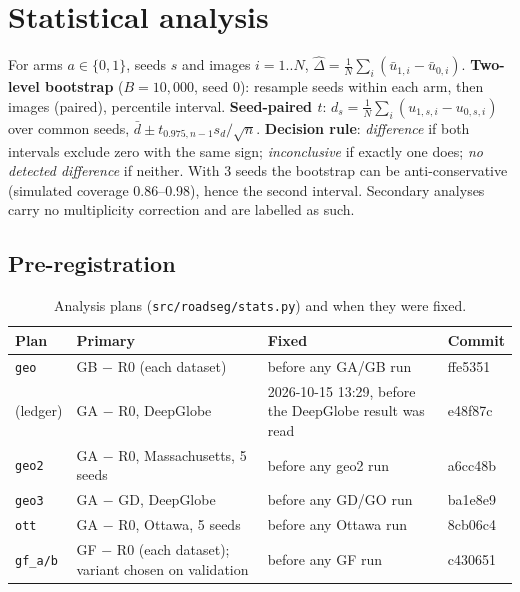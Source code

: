 \documentclass[11pt]{article}
\begin{document}
\section{Statistical analysis}
\label{sec:stats}

For arms $a\in\{0,1\}$, seeds $s$ and images $i=1..N$, $\hat\Delta = \frac1N\sum_i(\bar u_{1,i}-\bar u_{0,i})$.
\textbf{Two-level bootstrap} ($B=10{,}000$, seed 0): resample seeds within each arm, then images
(paired), percentile interval. \textbf{Seed-paired $t$}: $d_s=\frac1N\sum_i(u_{1,s,i}-u_{0,s,i})$ over
common seeds, $\bar d\pm t_{0.975,n-1}s_d/\sqrt n$. \textbf{Decision rule}: \emph{difference} if both
intervals exclude zero with the same sign; \emph{inconclusive} if exactly one does; \emph{no detected
difference} if neither. With 3 seeds the bootstrap can be anti-conservative (simulated coverage
0.86--0.98), hence the second interval. Secondary analyses carry no multiplicity correction and are
labelled as such.

\subsection{Pre-registration}
\label{sec:prereg}
\begin{table}[H]
\centering
\caption{Analysis plans (\texttt{src/roadseg/stats.py}) and when they were fixed.}
\small
\begin{tabular}{@{}p{1.4cm}p{3.6cm}p{5.4cm}p{3.6cm}@{}}
\toprule
Plan & Primary & Fixed & Commit \\
\midrule
\texttt{geo} & GB $-$ R0 (each dataset) & before any GA/GB run & ffe5351 \\
(ledger) & GA $-$ R0, DeepGlobe & 2026-10-15 13:29, before the DeepGlobe result was read & e48f87c \\
\texttt{geo2} & GA $-$ R0, Massachusetts, 5 seeds & before any geo2 run & a6cc48b \\
\texttt{geo3} & GA $-$ GD, DeepGlobe & before any GD/GO run & ba1e8e9 \\
\texttt{ott} & GA $-$ R0, Ottawa, 5 seeds & before any Ottawa run & 8cb06c4 \\
\texttt{gf\_a/b} & GF $-$ R0 (each dataset); variant chosen on validation & before any GF run & c430651 \\
\bottomrule
\end{tabular}
\end{table}
\end{document}
